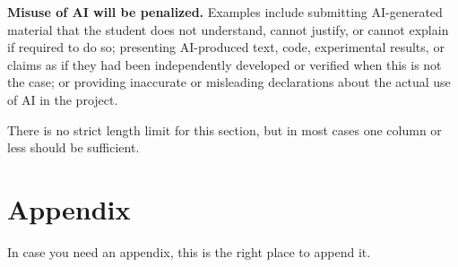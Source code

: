 \documentclass{article}
\begin{document}
\textbf{Misuse of AI will be penalized.} Examples include submitting AI-generated material that the student does not understand, cannot justify, or cannot explain if required to do so; presenting AI-produced text, code, experimental results, or claims as if they had been independently developed or verified when this is not the case; or providing inaccurate or misleading declarations about the actual use of AI in the project.

There is no strict length limit for this section, but in most cases one column or less should be sufficient.





\section*{Appendix}
%
In case you need an appendix, this is the right place to append it.
\end{document}
